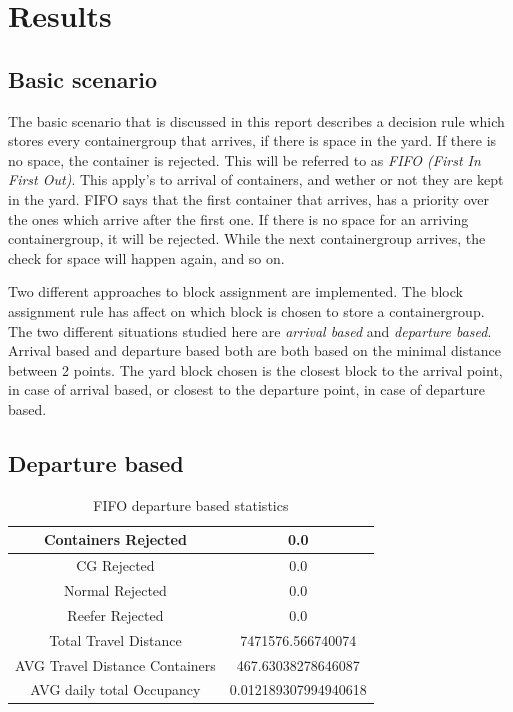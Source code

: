 \documentclass[]{article}
\begin{document}
\section{Results}

\subsection{Basic scenario}
The basic scenario that is discussed in this report describes a decision rule
which stores every containergroup that arrives, if there is space in the yard.
If there is no space, the container is rejected. This will be referred to as
\textit{FIFO (First In First Out)}. This apply's to arrival of containers, and
wether or not they are kept in the yard. FIFO says that the first container
that arrives, has a priority over the ones which arrive after the first one. If
there is no space for an arriving containergroup, it will be rejected. While
the next containergroup arrives, the check for space will happen again, and so
on.

Two different approaches to block assignment are implemented. The block
assignment rule has affect on which block is chosen to store a containergroup.
The two different situations studied here are \textit{arrival based} and
\textit{departure based}. Arrival based and departure based both are both based
on the minimal distance between 2 points. The yard block chosen is the closest
block to the arrival point, in case of arrival based, or closest to the
departure point, in case of departure based.
\subsection{Departure based}

\begin{table}[h]
	\centering
	\begin{tabular}{|c|c|}
		\hline
		Containers Rejected            & 0.0                  \\ \hline
		CG Rejected                    & 0.0                  \\ \hline
		Normal Rejected                & 0.0                  \\ \hline
		Reefer Rejected                & 0.0                  \\ \hline
		Total Travel Distance          & 7471576.566740074    \\ \hline
		AVG Travel Distance Containers & 467.63038278646087   \\ \hline
		AVG daily total Occupancy      & 0.012189307994940618 \\ \hline
	\end{tabular}
	\caption{FIFO departure based statistics}
\end{table}
\end{document}
